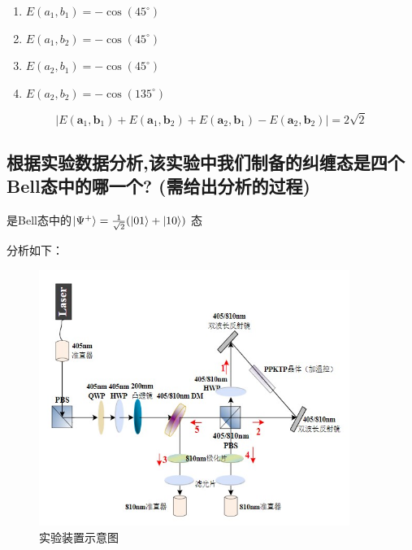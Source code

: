 \documentclass[a4paper,UTF8]{ctexart}
\begin{document}
\begin{enumerate}
    \item $E(a_1,b_1) = - \cos(45^{\circ})$
    \item $E(a_1,b_2) = - \cos(45^{\circ})$
    \item $E(a_2,b_1) = - \cos(45^{\circ})$
    \item $E(a_2,b_2) = - \cos(135^{\circ})$
\end{enumerate}

$$
|E\left(\boldsymbol{a}_1,\boldsymbol{b}_1\right)+E\left(\boldsymbol{a}_1,\boldsymbol{b}_2\right)+E\left(\boldsymbol{a}_2,\boldsymbol{b}_1\right)-E\left(\boldsymbol{a}_2,\boldsymbol{b}_2\right)| = 2\sqrt{2}
$$

\subsection{根据实验数据分析,该实验中我们制备的纠缠态是四个Bell态中的哪一个?  (需给出分析的过程)}

是Bell态中的$\ket{\Psi^{+}} = \frac{1}{\sqrt{2}}(\ket{01}+\ket{10})$ 态

分析如下：

\begin{figure}[H]
    \centering
    \begin{minipage}[b]{0.9\textwidth}
        \centering
        \includegraphics[width=0.9\textwidth]{./fig2.jpg}
        \caption{实验装置示意图}
    \end{minipage}
\end{figure}
\end{document}
